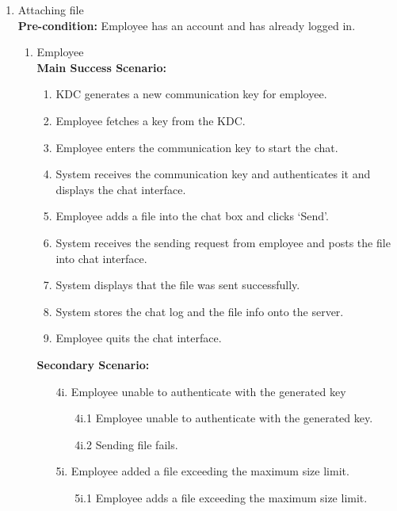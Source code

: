 \documentclass[]{article}
\begin{document}
\begin{enumerate}[{\bf BE1.}]
\begin{enumerate}[{\bf BE7.}]
	\item Attaching file  \\
        \textbf{Pre-condition:} Employee has an account and has already logged in.
		\begin{enumerate}[{\bf VP1.}]
			\item Employee \\
				\textbf{Main Success Scenario:}
                \begin{enumerate}[{  1.}]
                    \item KDC generates a new communication key for employee.
                    \item Employee fetches a key from the KDC.
                    \item Employee enters the communication key to start the chat. 
                    \item System receives the communication key and authenticates it and displays the chat interface.
                    \item Employee adds a file into the chat box and clicks ‘Send’.
                    \item System receives the sending request from employee and posts the file into chat interface. 
                    \item System displays that the file was sent successfully.
                    \item System stores the chat log and the file info onto the server.
                    \item Employee quits the chat interface.
                \end{enumerate}
                \textbf{Secondary Scenario:}
                \begin{enumerate}
                    \item[4i.] Employee unable to authenticate with the generated key 
                    \begin{enumerate}
                        \item[4i.1] Employee unable to authenticate with the generated key.
                        \item[4i.2] Sending file fails.
                    \end{enumerate}
                    \item[5i.] Employee added a file exceeding the maximum size limit.
                    \begin{enumerate}
                        \item[5i.1] Employee adds a file exceeding the maximum size limit.

\end{enumerate}
\end{enumerate}
\end{enumerate}
\end{enumerate}
\end{enumerate}
\end{document}
